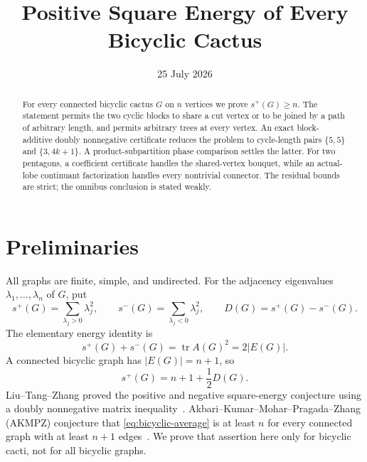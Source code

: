 \documentclass[11pt]{article}
\title{Positive Square Energy of Every Bicyclic Cactus}
\author{}
\date{25 July 2026}
\theoremstyle{remark}
\newcommand{\tr}{\operatorname{tr}}
\begin{document}
\maketitle

\begin{abstract}
For every connected bicyclic cactus $G$ on $n$ vertices we prove
$s^+(G)\geq n$.  The statement permits the two cyclic blocks to share a cut
vertex or to be joined by a path of arbitrary length, and permits arbitrary
trees at every vertex.  An exact block-additive doubly nonnegative certificate
reduces the problem to cycle-length pairs $\{5,5\}$ and $\{3,4k+1\}$.
A product-subpartition phase comparison settles the latter.  For two
pentagons, a coefficient certificate handles the shared-vertex bouquet, while
an actual-lobe continuant factorization handles every nontrivial connector.
The residual bounds are strict; the omnibus conclusion is stated weakly.
\end{abstract}

\section{Preliminaries}

All graphs are finite, simple, and undirected.  For the adjacency eigenvalues
$\lambda_1,\ldots,\lambda_n$ of $G$, put
\[
 s^+(G)=\sum_{\lambda_j>0}\lambda_j^2,
 \qquad s^-(G)=\sum_{\lambda_j<0}\lambda_j^2,
 \qquad D(G)=s^+(G)-s^-(G).
\]
The elementary energy identity is
\begin{equation}\label{eq:energy}
 s^+(G)+s^-(G)=\tr A(G)^2=2|E(G)|.
\end{equation}
A connected bicyclic graph has $|E(G)|=n+1$, so
\begin{equation}\label{eq:bicyclic-average}
 s^+(G)=n+1+\frac12D(G).
\end{equation}
Liu--Tang--Zhang proved the positive and negative square-energy conjecture
using a doubly nonnegative matrix inequality~\cite{LTZ}.
Akbari--Kumar--Mohar--Pragada--Zhang (AKMPZ) conjecture that
\eqref{eq:bicyclic-average} is at least $n$ for every connected graph with at
least $n+1$ edges~\cite{AKMPZ}.  We prove that assertion here only for
bicyclic cacti, not for all bicyclic graphs.
\end{document}
